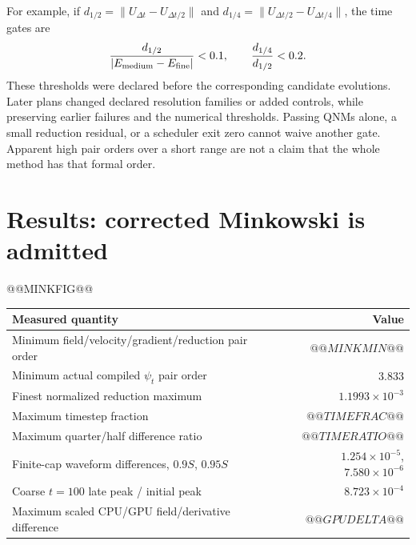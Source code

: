 \documentclass[11pt,letterpaper]{article}
\begin{document}
For example, if $d_{1/2}=\|U_{\Delta t}-U_{\Delta t/2}\|$ and $d_{1/4}=\|U_{\Delta t/2}-U_{\Delta t/4}\|$, the time gates are
\begin{equation}
 \frac{d_{1/2}}{|E_{\rm medium}-E_{\rm fine}|}<0.1,\qquad
 \frac{d_{1/4}}{d_{1/2}}<0.2.
\end{equation}
These thresholds were declared before the corresponding candidate evolutions. Later plans changed declared resolution families or added controls, while preserving earlier failures and the numerical thresholds. Passing QNMs alone, a small reduction residual, or a scheduler exit zero cannot waive another gate. Apparent high pair orders over a short range are not a claim that the whole method has that formal order.

\clearpage
\section{Results: corrected Minkowski is admitted}
@@MINKFIG@@

\begin{center}\small
\begin{tabularx}{\linewidth}{@{}Xr@{}}\toprule
Measured quantity & Value \\\midrule
Minimum field/velocity/gradient/reduction pair order & $@@MINKMIN@@$ \\
Minimum actual compiled $\psi_t$ pair order & $3.833$ \\
Finest normalized reduction maximum & $1.1993\times10^{-3}$ \\
Maximum timestep fraction & $@@TIMEFRAC@@$ \\
Maximum quarter/half difference ratio & $@@TIMERATIO@@$ \\
Finite-cap waveform differences, $0.9S$, $0.95S$ & $1.254\times10^{-5}$, $7.580\times10^{-6}$ \\
Coarse $t=100$ late peak / initial peak & $8.723\times10^{-4}$ \\
Maximum scaled CPU/GPU field/derivative difference & $@@GPUDELTA@@$ \\\bottomrule
\end{tabularx}
\end{center}
\end{document}
